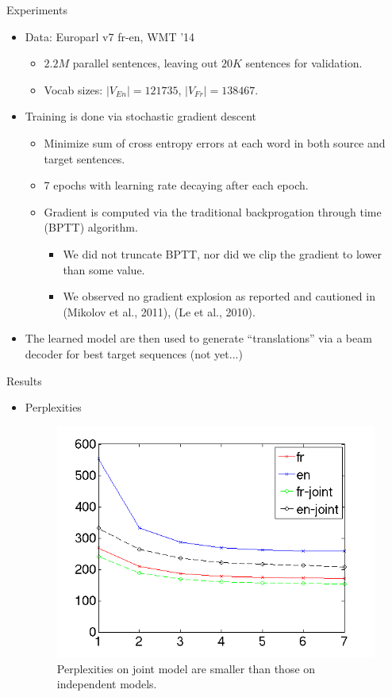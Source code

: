 \documentclass[pdf]{beamer}
\newcommand{\ABS}[1]{\lvert #1 \rvert}
\begin{document}
\begin{frame}{Experiments}
\begin{itemize}
\item Data: Europarl v7 fr-en, WMT '14
\begin{itemize}
\item $2.2M$ parallel sentences, leaving out $20K$ sentences for validation.
\item Vocab sizes: $\ABS{V_{En}} = 121735$, $\ABS{V_{Fr}} = 138467$.
\end{itemize}
\item Training is done via stochastic gradient descent
\begin{itemize}
\item Minimize sum of cross entropy errors at each word in both source and target sentences.
\item 7 epochs with learning rate decaying after each epoch.
\item Gradient is computed via the traditional backprogation through time (BPTT) algorithm.
\begin{itemize}
\item We did not truncate BPTT, nor did we clip the gradient to lower than some value.
\item We observed no gradient explosion as reported and cautioned in (Mikolov et al., 2011), (Le et al., 2010).
\end{itemize}
\end{itemize}
\item The learned model are then used to generate ``translations'' via a beam decoder for best target sequences (not yet...)
\end{itemize}
\end{frame}

\begin{frame}{Results}
\begin{itemize}
\item Perplexities
\begin{figure}
\begin{center}
\includegraphics[scale=0.35]{ppl.png}
\end{center}
\caption{\scriptsize{Perplexities on joint model are smaller than those on independent models.}}
\end{figure}
\end{itemize}
\end{frame}
\end{document}
